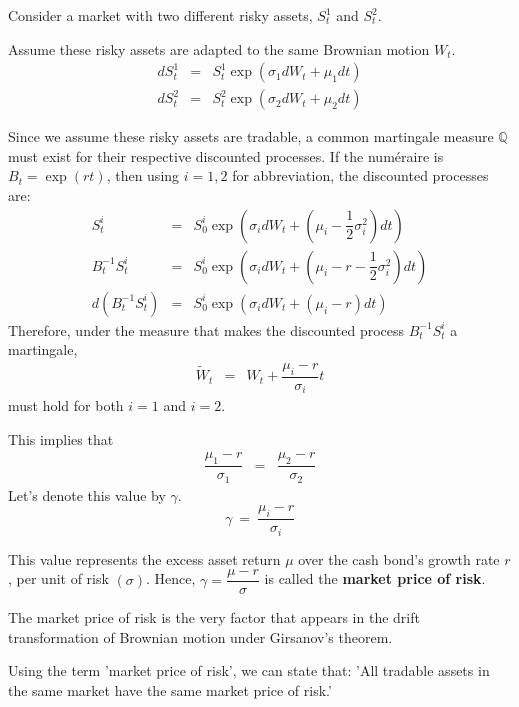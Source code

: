\documentclass[uplatex,a4j,12pt,dvipdfmx]{jsarticle}
\begin{document}
${}$

Consider a market with two different risky assets, $S^{1}_{t}$ and $S^{2}_{t}$.

Assume these risky assets are adapted to the same Brownian motion $W_{t}$.
%
%
\begin{eqnarray*}
	d S^{1}_{t}
	&=&
	S^{1}_{t} \exp \left( \sigma_{1} dW_{t} + \mu_{1} dt \right)
	\\
	d S^{2}_{t}
	&=&
	S^{2}_{t} \exp \left( \sigma_{2} dW_{t} + \mu_{2} dt \right)
\end{eqnarray*}
%
%

Since we assume these risky assets are tradable, a common martingale measure $\mathbb{Q}$ must exist for their respective discounted processes.
If the numéraire is $B_{t} = \exp ( rt)$, then using $i=1,2$ for abbreviation, the discounted processes are:
%
%
\begin{eqnarray*}
	S^{i}_{t}
	&=&
	S^{i}_{0} \exp \left( \sigma_{i} dW_{t} + \left( \mu_{i} - \dfrac{1}{2} \sigma_{i}^{2} \right) dt \right)
	\\
	B^{-1}_{t} S^{i}_{t}
	&=&
	S^{i}_{0} \exp \left( \sigma_{i} dW_{t} + \left( \mu_{i} - r - \dfrac{1}{2} \sigma_{i}^{2} \right) dt \right)
	\\
	d ( B^{-1}_{t} S^{i}_{t} )
	&=&
	S^{i}_{0} \exp \left( \sigma_{i} dW_{t} + \left( \mu_{i} - r \right) dt \right)
\end{eqnarray*}
%
%
Therefore, under the measure that makes the discounted process $B^{-1}_{t} S^{i}_{t}$ a martingale,
%
%
\begin{eqnarray*}
	\tilde{W}_{t}
	&=&
	W_{t}
	+
	\dfrac{\mu_{i} - r}{\sigma_{i}}
	t
\end{eqnarray*}
%
%
must hold for both $i=1$ and $i=2$.

This implies that
%
%
\begin{eqnarray*}
	\dfrac{\mu_{1} - r}{\sigma_{1}}
	&=&
	\dfrac{\mu_{2} - r}{\sigma_{2}}
\end{eqnarray*}
%
%
Let's denote this value by $\gamma$.
$$
	\gamma
	\ = \
	\dfrac{\mu_{i} - r}{\sigma_{i}}
$$

This value represents the excess asset return $\mu$ over the cash bond's growth rate $r$, per unit of risk $(\sigma)$. Hence, $\gamma=\dfrac{\mu -r}{\sigma}$ is called the \textbf{market price of risk}.

The market price of risk is the very factor that appears in the drift transformation of Brownian motion under Girsanov's theorem.

Using the term 'market price of risk', we can state that:
'All tradable assets in the same market have the same market price of risk.'
${}$
\end{document}
